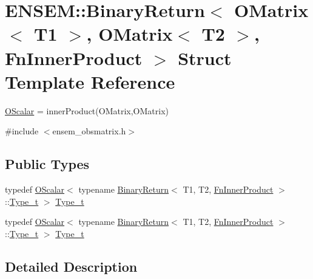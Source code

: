 \hypertarget{structENSEM_1_1BinaryReturn_3_01OMatrix_3_01T1_01_4_00_01OMatrix_3_01T2_01_4_00_01FnInnerProduct_01_4}{}\section{E\+N\+S\+EM\+:\+:Binary\+Return$<$ O\+Matrix$<$ T1 $>$, O\+Matrix$<$ T2 $>$, Fn\+Inner\+Product $>$ Struct Template Reference}
\label{structENSEM_1_1BinaryReturn_3_01OMatrix_3_01T1_01_4_00_01OMatrix_3_01T2_01_4_00_01FnInnerProduct_01_4}


\mbox{\hyperlink{classENSEM_1_1OScalar}{O\+Scalar}} = inner\+Product(\+O\+Matrix,\+O\+Matrix)  




{\ttfamily \#include $<$ensem\+\_\+obsmatrix.\+h$>$}

\subsection*{Public Types}
\begin{DoxyCompactItemize}
\item 
typedef \mbox{\hyperlink{classENSEM_1_1OScalar}{O\+Scalar}}$<$ typename \mbox{\hyperlink{structENSEM_1_1BinaryReturn}{Binary\+Return}}$<$ T1, T2, \mbox{\hyperlink{structENSEM_1_1FnInnerProduct}{Fn\+Inner\+Product}} $>$\+::\mbox{\hyperlink{structENSEM_1_1BinaryReturn_3_01OMatrix_3_01T1_01_4_00_01OMatrix_3_01T2_01_4_00_01FnInnerProduct_01_4_a28a5e6d9f636db51eb542a0a4602c034}{Type\+\_\+t}} $>$ \mbox{\hyperlink{structENSEM_1_1BinaryReturn_3_01OMatrix_3_01T1_01_4_00_01OMatrix_3_01T2_01_4_00_01FnInnerProduct_01_4_a28a5e6d9f636db51eb542a0a4602c034}{Type\+\_\+t}}
\item 
typedef \mbox{\hyperlink{classENSEM_1_1OScalar}{O\+Scalar}}$<$ typename \mbox{\hyperlink{structENSEM_1_1BinaryReturn}{Binary\+Return}}$<$ T1, T2, \mbox{\hyperlink{structENSEM_1_1FnInnerProduct}{Fn\+Inner\+Product}} $>$\+::\mbox{\hyperlink{structENSEM_1_1BinaryReturn_3_01OMatrix_3_01T1_01_4_00_01OMatrix_3_01T2_01_4_00_01FnInnerProduct_01_4_a28a5e6d9f636db51eb542a0a4602c034}{Type\+\_\+t}} $>$ \mbox{\hyperlink{structENSEM_1_1BinaryReturn_3_01OMatrix_3_01T1_01_4_00_01OMatrix_3_01T2_01_4_00_01FnInnerProduct_01_4_a28a5e6d9f636db51eb542a0a4602c034}{Type\+\_\+t}}
\end{DoxyCompactItemize}


\subsection{Detailed Description}
